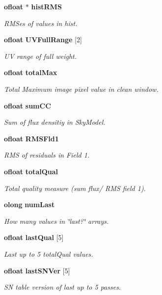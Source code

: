 \begin{CompactItemize}
{\bf ofloat} $\ast$ {\bf hist\-RMS}
\begin{CompactList}\small\item\em RMSes of values in hist. \item\end{CompactList}\item 
{\bf ofloat} {\bf UVFull\-Range} [2]
\begin{CompactList}\small\item\em UV range of full weight. \item\end{CompactList}\item 
{\bf ofloat} {\bf total\-Max}
\begin{CompactList}\small\item\em Total Maximum image pixel value in clean window. \item\end{CompactList}\item 
{\bf ofloat} {\bf sum\-CC}
\begin{CompactList}\small\item\em Sum of flux densitiy in Sky\-Model. \item\end{CompactList}\item 
{\bf ofloat} {\bf RMSFld1}
\begin{CompactList}\small\item\em RMS of residuals in Field 1. \item\end{CompactList}\item 
{\bf ofloat} {\bf total\-Qual}
\begin{CompactList}\small\item\em Total quality measure (sum flux/ RMS field 1). \item\end{CompactList}\item 
{\bf olong} {\bf num\-Last}
\begin{CompactList}\small\item\em How many values in \char`\"{}last?\char`\"{} arrays. \item\end{CompactList}\item 
{\bf ofloat} {\bf last\-Qual} [5]
\begin{CompactList}\small\item\em Last up to 5 total\-Qual values. \item\end{CompactList}\item 
{\bf ofloat} {\bf last\-SNVer} [5]
\begin{CompactList}\small\item\em SN table version of last up to 5 passes. \item\end{CompactList}\end{CompactItemize}


